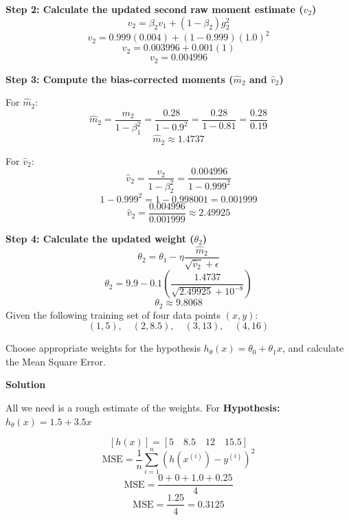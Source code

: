 \documentclass[12pt]{exam}
\begin{document}
\begin{questions}
                \textbf{Step 2: Calculate the updated second raw moment estimate ($v_2$)}
                \[ v_2 = \beta_2 v_{1} + (1 - \beta_2) g_2^2 \]
                \[ v_2 = 0.999(0.004) + (1 - 0.999)(1.0)^2 \]
                \[ v_2 = 0.003996 + 0.001(1) \]
                \[ v_2 = 0.004996 \]
                
                \textbf{Step 3: Compute the bias-corrected moments ($\hat{m}_2$ and $\hat{v}_2$)}
                
                For $\hat{m}_2$:
                \[ \hat{m}_2 = \frac{m_2}{1 - \beta_1^2} = \frac{0.28}{1 - 0.9^2} = \frac{0.28}{1 - 0.81} = \frac{0.28}{0.19} \]
                \[ \hat{m}_2 \approx 1.4737 \]
                
                For $\hat{v}_2$:
                \[ \hat{v}_2 = \frac{v_2}{1 - \beta_2^2} = \frac{0.004996}{1 - 0.999^2} \]
                \[ 1 - 0.999^2 = 1 - 0.998001 = 0.001999 \]
                \[ \hat{v}_2 = \frac{0.004996}{0.001999} \approx 2.49925 \]
                
                \textbf{Step 4: Calculate the updated weight ($\theta_2$)}
                \[ \theta_2 = \theta_{1} - \eta \frac{\hat{m}_2}{\sqrt{\hat{v}_2} + \epsilon} \]
                \[ \theta_2 = 9.9 - 0.1 \left( \frac{1.4737}{\sqrt{2.49925} + 10^{-8}} \right) \]
                \[ \theta_2 \approx 9.8068 \]
                \question[6] Given the following training set of four data points $(x, y)$:
                \[ (1, 5), \quad (2, 8.5), \quad (3, 13), \quad (4, 16) \]
                
                Choose appropriate weights for the  hypothesis $h_\theta(x) = \theta_0 + \theta_1 x$, and calculate the Mean Square Error.

                \textbf{Solution}

                
                All we need is a rough estimate of the weights. For \textbf{Hypothesis:} $h_\theta(x) = 1.5 + 3.5x$
                
                    \[ [h(x)] = [5 \quad 8.5 \quad 12 \quad 15.5 ] \] 
                \[ \text{MSE} = \frac{1}{n} \sum_{i=1}^{n} (h(x^{(i)}) - y^{(i)})^2 \]
                \[ \text{MSE} = \frac{0 + 0 + 1.0 + 0.25}{4} \]
                \[ \text{MSE} = \frac{1.25}{4} = \mathbf{0.3125} \]

                \end{questions}

                



%


\clearpage %
\end{document}
